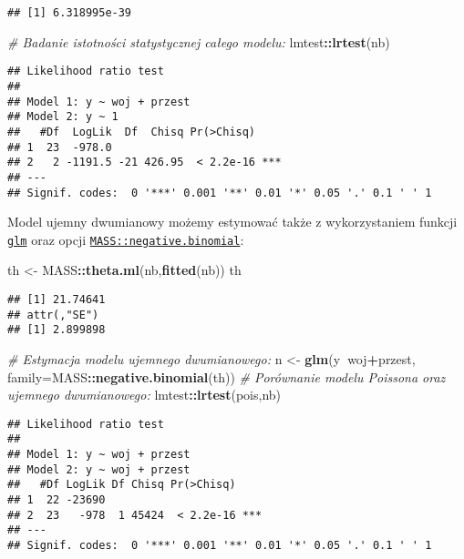 \documentclass[polish,]{book}
\newenvironment{Shaded}{\begin{snugshade}}{\end{snugshade}}
\newcommand{\CommentTok}[1]{\textcolor[rgb]{0.56,0.35,0.01}{\textit{#1}}}
\newcommand{\DataTypeTok}[1]{\textcolor[rgb]{0.13,0.29,0.53}{#1}}
\newcommand{\KeywordTok}[1]{\textcolor[rgb]{0.13,0.29,0.53}{\textbf{#1}}}
\newcommand{\NormalTok}[1]{#1}
\newcommand{\OperatorTok}[1]{\textcolor[rgb]{0.81,0.36,0.00}{\textbf{#1}}}
\newcommand{\StringTok}[1]{\textcolor[rgb]{0.31,0.60,0.02}{#1}}
\begin{document}
\begin{verbatim}
## [1] 6.318995e-39
\end{verbatim}

\begin{Shaded}
\begin{Highlighting}[]
\CommentTok{# Badanie istotności statystycznej całego modelu:}
\NormalTok{lmtest}\OperatorTok{::}\KeywordTok{lrtest}\NormalTok{(nb)}
\end{Highlighting}
\end{Shaded}

\begin{verbatim}
## Likelihood ratio test
## 
## Model 1: y ~ woj + przest
## Model 2: y ~ 1
##   #Df  LogLik  Df  Chisq Pr(>Chisq)    
## 1  23  -978.0                          
## 2   2 -1191.5 -21 426.95  < 2.2e-16 ***
## ---
## Signif. codes:  0 '***' 0.001 '**' 0.01 '*' 0.05 '.' 0.1 ' ' 1
\end{verbatim}

Model ujemny dwumianowy możemy estymować także z wykorzystaniem funkcji
\href{https://rdrr.io/r/stats/glm.html}{\texttt{glm}} oraz opcji \href{https://rdrr.io/cran/MASS/man/negative.binomial.html}{\texttt{MASS::negative.binomial}}:

\begin{Shaded}
\begin{Highlighting}[]
\NormalTok{th <-}\StringTok{ }\NormalTok{MASS}\OperatorTok{::}\KeywordTok{theta.ml}\NormalTok{(nb,}\KeywordTok{fitted}\NormalTok{(nb))}
\NormalTok{th}
\end{Highlighting}
\end{Shaded}

\begin{verbatim}
## [1] 21.74641
## attr(,"SE")
## [1] 2.899898
\end{verbatim}

\begin{Shaded}
\begin{Highlighting}[]
\CommentTok{# Estymacja modelu ujemnego dwumianowego:}
\NormalTok{n <-}\StringTok{ }\KeywordTok{glm}\NormalTok{(y}\OperatorTok{~}\NormalTok{woj}\OperatorTok{+}\NormalTok{przest, }\DataTypeTok{family=}\NormalTok{MASS}\OperatorTok{::}\KeywordTok{negative.binomial}\NormalTok{(th))}
\CommentTok{# Porównanie modelu Poissona oraz ujemnego dwumianowego:}
\NormalTok{lmtest}\OperatorTok{::}\KeywordTok{lrtest}\NormalTok{(pois,nb)}
\end{Highlighting}
\end{Shaded}

\begin{verbatim}
## Likelihood ratio test
## 
## Model 1: y ~ woj + przest
## Model 2: y ~ woj + przest
##   #Df LogLik Df Chisq Pr(>Chisq)    
## 1  22 -23690                        
## 2  23   -978  1 45424  < 2.2e-16 ***
## ---
## Signif. codes:  0 '***' 0.001 '**' 0.01 '*' 0.05 '.' 0.1 ' ' 1
\end{verbatim}
\end{document}
